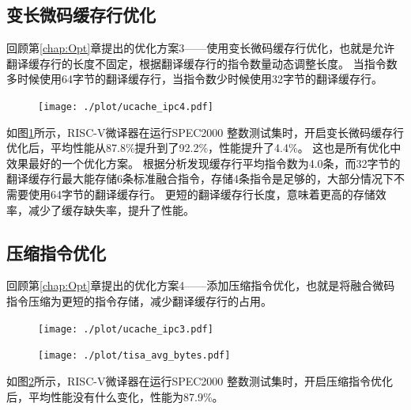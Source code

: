 \subsection{变长微码缓存行优化}

回顾第\ref{chap:Opt}章提出的优化方案3——使用变长微码缓存行优化，也就是允许翻译缓存行的长度不固定，根据翻译缓存行的指令数量动态调整长度。
当指令数多时候使用64字节的翻译缓存行，当指令数少时候使用32字节的翻译缓存行。

\begin{figure}[!htbp]
  \centering
  \texttt{[image: ./plot/ucache\_ipc4.pdf]}
  \label{img:ipc4}
\end{figure}


如图\ref{img:ipc4}所示，RISC-V微译器在运行SPEC2000 整数测试集时，开启变长微码缓存行优化后，平均性能从87.8\%提升到了92.2\%，性能提升了4.4\%。
这也是所有优化中效果最好的一个优化方案。
根据分析发现缓存行平均指令数为4.0条，而32字节的翻译缓存行最大能存储6条标准融合指令，存储4条指令是足够的，大部分情况下不需要使用64字节的翻译缓存行。
更短的翻译缓存行长度，意味着更高的存储效率，减少了缓存缺失率，提升了性能。

\subsection{压缩指令优化}

回顾第\ref{chap:Opt}章提出的优化方案4——添加压缩指令优化，也就是将融合微码指令压缩为更短的指令存储，减少翻译缓存行的占用。

\begin{figure}[!htbp]
  \centering
  \texttt{[image: ./plot/ucache\_ipc3.pdf]}
  \label{img:ipc3}
\end{figure}

\begin{figure}[!htbp]
  \centering
  \texttt{[image: ./plot/tisa\_avg\_bytes.pdf]}
  \label{img:avg_bytes}
\end{figure}


如图\ref{img:ipc3}所示，RISC-V微译器在运行SPEC2000 整数测试集时，开启压缩指令优化后，平均性能没有什么变化，性能为87.9\%。

